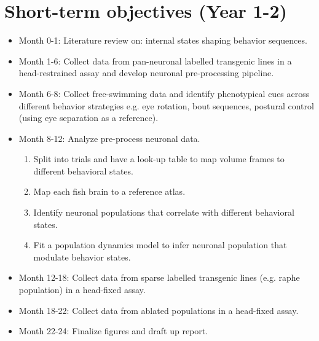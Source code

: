 \documentclass[]{article}
\begin{document}
\section{Short-term objectives (Year 1-2)}
\begin{itemize}
    \item Month 0-1: Literature review on: internal states shaping behavior sequences.
    \item Month 1-6: Collect data from pan-neuronal labelled transgenic lines in a head-restrained assay and develop neuronal pre-processing pipeline.
    \item Month 6-8: Collect free-swimming data and identify phenotypical cues across different behavior strategies e.g. eye rotation, bout sequences, postural control (using eye separation as a reference).
    \item Month 8-12: Analyze pre-process neuronal data.
    \begin{enumerate}
        \item Split into trials and have a look-up table to map volume frames to different behavioral states.
        \item Map each fish brain to a reference atlas.
        \item Identify neuronal populations that correlate with different behavioral states.
        \item Fit a population dynamics model to infer neuronal population that modulate behavior states.
    \end{enumerate}
    \item Month 12-18: Collect data from sparse labelled transgenic lines (e.g. raphe population) in a head-fixed assay.
    \item Month 18-22: Collect data from ablated populations in a head-fixed assay.
    \item Month 22-24: Finalize figures and draft up report.
\end{itemize}
\end{document}
